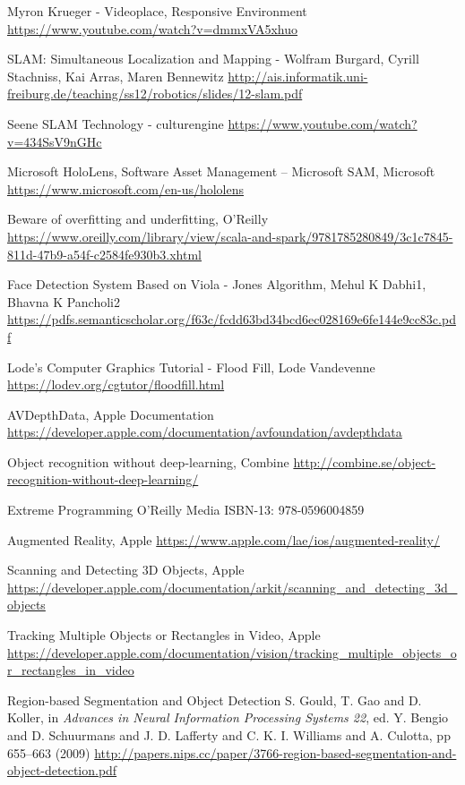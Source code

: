 
\begin{thebibliography}{X}

Myron Krueger - Videoplace, Responsive Environment
\url{https://www.youtube.com/watch?v=dmmxVA5xhuo}

SLAM: Simultaneous Localization and Mapping - Wolfram Burgard, Cyrill Stachniss, Kai Arras, Maren Bennewitz
\url{http://ais.informatik.uni-freiburg.de/teaching/ss12/robotics/slides/12-slam.pdf}

Seene SLAM Technology - culturengine
\url{https://www.youtube.com/watch?v=434SsV9nGHc}

Microsoft HoloLens, Software Asset Management – Microsoft SAM, Microsoft
\url{https://www.microsoft.com/en-us/hololens}

Beware of overfitting and underfitting, O'Reilly
\url{https://www.oreilly.com/library/view/scala-and-spark/9781785280849/3c1c7845-811d-47b9-a54f-c2584fe930b3.xhtml}

Face Detection System Based on Viola - Jones Algorithm, Mehul K Dabhi1, Bhavna K Pancholi2
\url{https://pdfs.semanticscholar.org/f63c/fcdd63bd34bcd6ec028169e6fe144e9cc83c.pdf}

Lode's Computer Graphics Tutorial - Flood Fill, Lode Vandevenne
\url{https://lodev.org/cgtutor/floodfill.html}

AVDepthData, Apple Documentation
\url{https://developer.apple.com/documentation/avfoundation/avdepthdata}

Object recognition without deep-learning, Combine
\url{http://combine.se/object-recognition-without-deep-learning/}

Extreme Programming
O'Reilly Media
ISBN-13: 978-0596004859

Augmented Reality, Apple
\url{https://www.apple.com/lae/ios/augmented-reality/}

Scanning and Detecting 3D Objects, Apple
\url{https://developer.apple.com/documentation/arkit/scanning_and_detecting_3d_objects}

Tracking Multiple Objects or Rectangles in Video, Apple
\url{https://developer.apple.com/documentation/vision/tracking_multiple_objects_or_rectangles_in_video}

Region-based Segmentation and Object Detection
S. Gould, T. Gao and D. Koller, in \textit{Advances in Neural Information Processing Systems 22}, 
ed. Y. Bengio and D. Schuurmans and J. D. Lafferty 
and C. K. I. Williams and A. Culotta, 
pp 655--663
(2009)
\url{http://papers.nips.cc/paper/3766-region-based-segmentation-and-object-detection.pdf}


\end{thebibliography}

